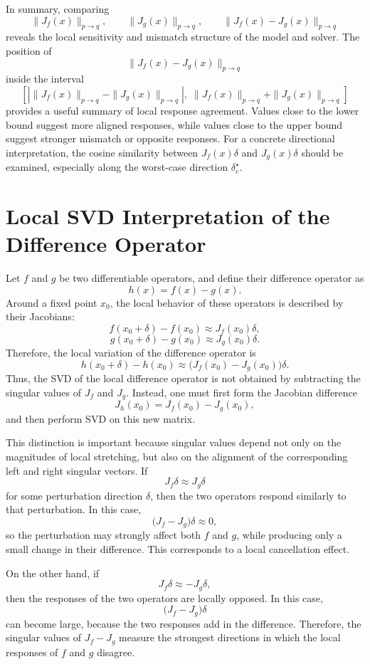 \documentclass{article}
\begin{document}
In summary, comparing
\[
\|J_f(x)\|_{p\to q},
\qquad
\|J_g(x)\|_{p\to q},
\qquad
\|J_f(x)-J_g(x)\|_{p\to q}
\]
reveals the local sensitivity and mismatch structure of the model and solver. The position of
\[
\|J_f(x)-J_g(x)\|_{p\to q}
\]
inside the interval
\[
\left[
\left|\|J_f(x)\|_{p\to q}-\|J_g(x)\|_{p\to q}\right|,
\;
\|J_f(x)\|_{p\to q}+\|J_g(x)\|_{p\to q}
\right]
\]
provides a useful summary of local response agreement. Values close to the lower bound suggest more aligned responses, while values close to the upper bound suggest stronger mismatch or opposite responses. For a concrete directional interpretation, the cosine similarity between \(J_f(x)\delta\) and \(J_g(x)\delta\) should be examined, especially along the worst-case direction \(\delta_e^\star\).

\section{Local SVD Interpretation of the Difference Operator}

Let \(f\) and \(g\) be two differentiable operators, and define their difference operator as
\[
h(x)=f(x)-g(x).
\]
Around a fixed point \(x_0\), the local behavior of these operators is described by their Jacobians:
\[
f(x_0+\delta)-f(x_0)\approx J_f(x_0)\delta,
\]
\[
g(x_0+\delta)-g(x_0)\approx J_g(x_0)\delta.
\]
Therefore, the local variation of the difference operator is
\[
h(x_0+\delta)-h(x_0)
\approx
\bigl(J_f(x_0)-J_g(x_0)\bigr)\delta.
\]
Thus, the SVD of the local difference operator is not obtained by subtracting the singular values of \(J_f\) and \(J_g\). Instead, one must first form the Jacobian difference
\[
J_h(x_0)=J_f(x_0)-J_g(x_0),
\]
and then perform SVD on this new matrix.

This distinction is important because singular values depend not only on the magnitudes of local stretching, but also on the alignment of the corresponding left and right singular vectors. If
\[
J_f\delta \approx J_g\delta
\]
for some perturbation direction \(\delta\), then the two operators respond similarly to that perturbation. In this case,
\[
\bigl(J_f-J_g\bigr)\delta \approx 0,
\]
so the perturbation may strongly affect both \(f\) and \(g\), while producing only a small change in their difference. This corresponds to a local cancellation effect.

On the other hand, if
\[
J_f\delta \approx -J_g\delta,
\]
then the responses of the two operators are locally opposed. In this case,
\[
\bigl(J_f-J_g\bigr)\delta
\]
can become large, because the two responses add in the difference. Therefore, the singular values of \(J_f-J_g\) measure the strongest directions in which the local responses of \(f\) and \(g\) disagree.
\end{document}
